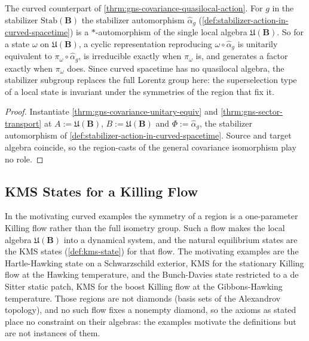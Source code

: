 \begin{theorem}
    \label{thrm:gns-covariance-stabilizer-action}
    \leanok
    The curved counterpart of \ref{thrm:gns-covariance-quasilocal-action}. For $g$ in the stabilizer $\mathrm{Stab}(\mathbf{B})$ the stabilizer automorphism $\hat\alpha_g$ (\ref{def:stabilizer-action-in-curved-spacetime}) is a $*$-automorphism of the single local algebra $\mathfrak{U}(\mathbf{B})$. So for a state $\omega$ on $\mathfrak{U}(\mathbf{B})$, a cyclic representation reproducing $\omega \circ \hat\alpha_g$ is unitarily equivalent to $\pi_\omega \circ \hat\alpha_g$, is irreducible exactly when $\pi_\omega$ is, and generates a factor exactly when $\pi_\omega$ does. Since curved spacetime has no quasilocal algebra, the stabilizer subgroup replaces the full Lorentz group here: the superselection type of a local state is invariant under the symmetries of the region that fix it.
\end{theorem}
\begin{proof}
    \leanok
    Instantiate \ref{thrm:gns-covariance-unitary-equiv} and \ref{thrm:gns-sector-transport} at $A := \mathfrak{U}(\mathbf{B})$, $B := \mathfrak{U}(\mathbf{B})$ and $\Phi := \hat\alpha_g$, the stabilizer automorphism of \ref{def:stabilizer-action-in-curved-spacetime}. Source and target algebra coincide, so the region-casts of the general covariance isomorphism play no role.
\end{proof}

\subsection{KMS States for a Killing Flow}

In the motivating curved examples the symmetry of a region is a one-parameter Killing flow rather than the full isometry group. Such a flow makes the local algebra $\mathfrak{U}(\mathbf{B})$ into a dynamical system, and the natural equilibrium states are the KMS states (\ref{def:kms-state}) for that flow. The motivating examples are the Hartle-Hawking state on a Schwarzschild exterior, KMS for the stationary Killing flow at the Hawking temperature, and the Bunch-Davies state restricted to a de Sitter static patch, KMS for the boost Killing flow at the Gibbons-Hawking temperature. Those regions are not diamonds (basis sets of the Alexandrov topology), and no such flow fixes a nonempty diamond, so the axioms as stated place no constraint on their algebras: the examples motivate the definitions but are not instances of them.


